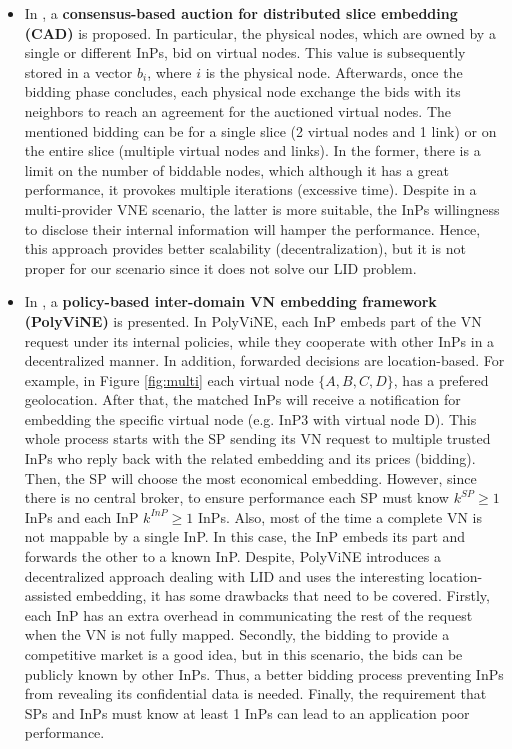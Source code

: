 \begin{itemize}
	\item In \citep{esposito2013general}, a \textbf{consensus-based auction for distributed slice embedding (CAD)} is proposed. In particular, the physical nodes, which are owned by a single or different InPs, bid on virtual nodes. This value is subsequently stored in a vector $b_i$, where $i$ is the physical node. Afterwards, once the bidding phase concludes, each physical node exchange the bids with its neighbors to reach an agreement for the auctioned virtual nodes. The mentioned bidding can be for a single slice (2 virtual nodes and 1 link) or on the entire slice (multiple virtual nodes and links). In the former, there is a limit on the number of biddable nodes, which although it has a great performance, it provokes multiple iterations (excessive time). Despite in a multi-provider VNE scenario, the latter is more suitable, the InPs willingness to disclose their internal information will hamper the performance. Hence, this approach provides better scalability (decentralization), but it is not proper for our scenario since it does not solve our LID problem.
	\item In \citep{chowdhury2010polyvine}, a \textbf{policy-based inter-domain VN embedding framework (PolyViNE)} is presented. In PolyViNE, each InP embeds part of the VN request under its internal policies, while they cooperate with other InPs in a decentralized manner. In addition, forwarded decisions are location-based. For example, in Figure \ref{fig:multi} each virtual node $\{A,B,C,D\}$, has a prefered geolocation. After that, the matched InPs will receive a notification for embedding the specific virtual node (e.g. InP3 with virtual node D). This whole process starts with the SP sending its VN request to multiple trusted InPs who reply back with the related embedding and its prices (bidding). Then, the SP will choose the most economical embedding. However, since there is no central broker, to ensure performance each SP must know $k^{SP} \geq 1$ InPs and each InP $k^{InP} \geq 1$ InPs. Also, most of the time a complete VN is not mappable by a single InP. In this case, the InP embeds its part and forwards the other to a known InP. \newline
Despite, PolyViNE introduces a decentralized approach dealing with LID and uses the interesting location-assisted embedding, it has some drawbacks that need to be covered. Firstly, each InP has an extra overhead in communicating the rest of the request when the VN is not fully mapped. Secondly, the bidding to provide a competitive market is a good idea, but in this scenario, the bids can be publicly known by other InPs. Thus, a better bidding process preventing InPs from revealing its confidential data is needed. Finally, the requirement that SPs and InPs must know at least 1 InPs can lead to an application poor performance.
	

\end{itemize}
